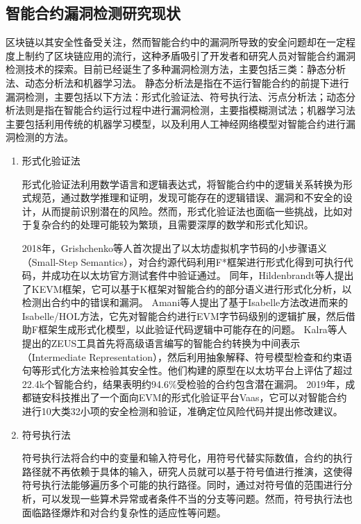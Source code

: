 \subsection{智能合约漏洞检测研究现状}
区块链以其安全性备受关注，然而智能合约中的漏洞所导致的安全问题却在一定程度上制约了区块链应用的流行，这种矛盾吸引了开发者和研究人员对智能合约漏洞检测技术的探索。目前已经诞生了多种漏洞检测方法，主要包括三类：静态分析法、动态分析法和机器学习法。
静态分析法是指在不运行智能合约的前提下进行漏洞检测，主要包括以下方法：形式化验证法、符号执行法、污点分析法；动态分析法则是指在智能合约运行过程中进行漏洞检测，主要指模糊测试法；机器学习法主要包括利用传统的机器学习模型，以及利用人工神经网络模型对智能合约进行漏洞检测的方法。
\begin{enumerate}[label=\Alph*., align=left, leftmargin=*]
    \item 形式化验证法
    
    形式化验证法利用数学语言和逻辑表达式，将智能合约中的逻辑关系转换为形式规范，通过数学推理和证明，发现可能存在的逻辑错误、漏洞和不安全的设计，从而提前识别潜在的风险。然而，形式化验证法也面临一些挑战，比如对于复杂合约的处理可能较为繁琐，且需要深厚的数学和形式化知识。
    
    2018年，Grishchenko等人首次提出了以太坊虚拟机字节码的小步骤语义\cite{grishchenko2018semantic}（Small-Step Semantics），对合约源代码利用F*框架进行形式化得到可执行代码，并成功在以太坊官方测试套件中验证通过。
    同年，Hildenbrandt等人提出了KEVM框架\cite{hildenbrandt2018kevm}，它可以基于K框架对智能合约的部分语义进行形式化分析，以检测出合约中的错误和漏洞。
    Amani等人提出了基于Isabelle方法改进而来的Isabelle/HOL方法\cite{amani2018}，它先对智能合约进行EVM字节码级别的逻辑扩展，然后借助F框架生成形式化模型，以此验证代码逻辑中可能存在的问题。
    Kalra等人提出的ZEUS工具\cite{kalra2018zeus}首先将高级语言编写的智能合约转换为中间表示（Intermediate Representation），然后利用抽象解释、符号模型检查和约束语句等形式化方法来检验其安全性。他们构建的原型在以太坊平台上评估了超过22.4k个智能合约，结果表明约94.6\%受检验的合约包含潜在漏洞。
    2019年，成都链安科技推出了一个面向EVM的形式化验证平台Vaas\cite{lianan}，它可以对智能合约进行10大类32小项的安全检测和验证，准确定位风险代码并提出修改建议。

    \item 符号执行法
    
    符号执行法将合约中的变量和输入符号化，用符号代替实际数值，合约的执行路径就不再依赖于具体的输入，研究人员就可以基于符号值进行推演，这使得符号执行法能够遍历多个可能的执行路径。同时，通过对符号值的范围进行分析，可以发现一些算术异常或者条件不当的分支等问题。然而，符号执行法也面临路径爆炸和对合约复杂性的适应性等问题。
    

\end{enumerate}
